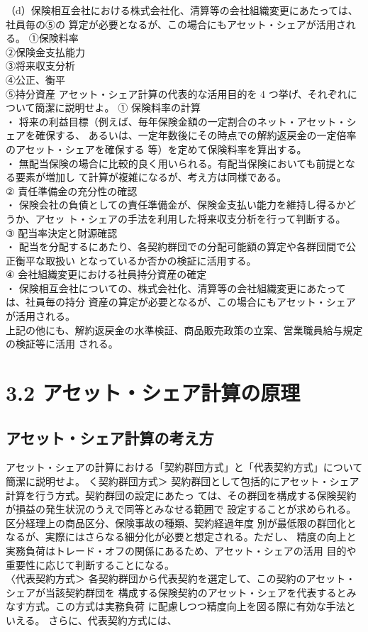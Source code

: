 \documentclass[report,gutter=10mm,fore-edge=10mm,uplatex,dvipdfmx]{jlreq}
\begin{document}
（d）保険相互会社における株式会社化、清算等の会社組織変更にあたっては、社員毎の⑤の
算定が必要となるが、この場合にもアセット・シェアが活用される。
\answer{}
\noindent ①保険料率\\②保険金支払能力\\
③将来収支分析\\④公正、衡平\\⑤持分資産
アセット・シェア計算の代表的な活用目的を 4 つ挙げ、それぞれについて簡潔に説明せよ。
\answer{}
\noindent
① 保険料率の計算\\
・ 将来の利益目標（例えば、毎年保険金額の一定割合のネット・アセット・シェアを確保する、
あるいは、一定年数後にその時点での解約返戻金の一定倍率のアセット・シェアを確保する
等）を定めて保険料率を算出する。\\
・ 無配当保険の場合に比較的良く用いられる。有配当保険においても前提となる要素が増加し
て計算が複雑になるが、考え方は同様である。\\
② 責任準備金の充分性の確認\\
・ 保険会社の負債としての責任準備金が、保険金支払い能力を維持し得るかどうか、アセッ
ト・シェアの手法を利用した将来収支分析を行って判断する。\\
③ 配当率決定と財源確認\\
・ 配当を分配するにあたり、各契約群団での分配可能額の算定や各群団間で公正衡平な取扱い
となっているか否かの検証に活用する。\\
④ 会社組織変更における社員持分資産の確定\\
・ 保険相互会社についての、株式会社化、清算等の会社組織変更にあたっては、社員毎の持分
資産の算定が必要となるが、この場合にもアセット・シェアが活用される。\\
上記の他にも、解約返戻金の水準検証、商品販売政策の立案、営業職員給与規定の検証等に活用
される。

\section{3.2 アセット・シェア計算の原理}
\subsection{アセット・シェア計算の考え方}
アセット・シェアの計算における「契約群団方式」と「代表契約方式」について簡潔に説明せよ。
\answer{}
\noindent
く契約群団方式＞
契約群団として包括的にアセット・シェア計算を行う方式。契約群団の設定にあたっ
ては、その群団を構成する保険契約が損益の発生状況のうえで同等とみなせる範囲で
設定することが求められる。区分経理上の商品区分、保険事故の種類、契約経過年度
別が最低限の群団化となるが、実際にはさらなる細分化が必要と想定される。ただし、
精度の向上と実務負荷はトレード・オフの関係にあるため、アセット・シェアの活用
目的や重要性に応じて判断することになる。\\
〈代表契約方式＞
各契約群団から代表契約を選定して、この契約のアセット・シェアが当該契約群団を
構成する保険契約のアセット・シェアを代表するとみなす方式。この方式は実務負荷
に配慮しつつ精度向上を図る際に有効な手法といえる。
さらに、代表契約方式には、
\end{document}
